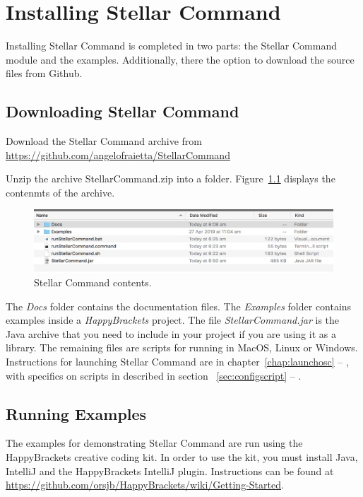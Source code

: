 \chapter{Installing Stellar Command} \label{chap:install}
Installing Stellar Command is completed in two parts: the Stellar Command module and the examples. Additionally, there the option to download the source files from Github.
\section{Downloading Stellar Command}
Download the Stellar Command archive from \url{https://github.com/angelofraietta/StellarCommand}

Unzip the archive StellarCommand.zip into a folder. Figure~\ref{fig:zipcontents} displays the contenmts of the archive. 

\begin{figure}[htbp]
	\centering
	\includegraphics[width=1\columnwidth]{zipcontents}
	\caption{Stellar Command contents.}
	\label{fig:zipcontents}
\end{figure}

The \textit{Docs} folder contains the documentation files. The \textit{Examples} folder contains examples inside a \textit{HappyBrackets} project. The file \textit{StellarCommand.jar} is the Java archive that you need to include in your project if you are using it as a library. The remaining files are scripts for running in MacOS, Linux or Windows. Instructions for launching Stellar Command are in chapter~\ref{chap:launchosc} --
\emph{}, with specifics on scripts in described in section ~\ref{sec:configscript} --
\emph{}.

\section{Running Examples}
The examples for demonstrating Stellar Command are run using the HappyBrackets creative coding kit. In order to use the kit, you must install Java, IntelliJ and the HappyBrackets IntelliJ plugin. Instructions can be found at \url{https://github.com/orsjb/HappyBrackets/wiki/Getting-Started}.

